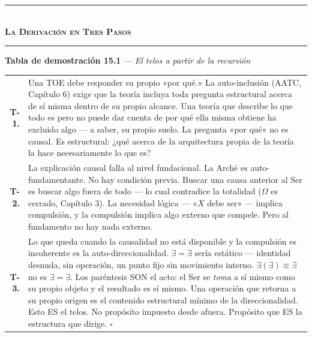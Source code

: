 \documentclass[10pt, openany, oneside]{book}
\renewcommand{\normalsize}{\fontsize{10}{13}\selectfont}
\renewcommand{\footnotesize}{\fontsize{8.5}{11}\selectfont}
\begin{document}

\begin{center}
    \rule{0.3\textwidth}{0.4pt}\\[0.5em]
    {\normalsize\bfseries\scshape La Derivación en Tres Pasos}\\[0.3em]
    \rule{0.3\textwidth}{0.4pt}
\end{center}

\vspace{1em}

\textbf{Tabla de demostración 15.1} --- \textit{El telos a partir de la recursión}

\vspace{0.5em}

{\footnotesize
\noindent\begin{tabular}{r p{}}
\textbf{T-1.} & Una TOE debe responder su propio «por qué.» La auto-inclusión (AATC, Capítulo 6) exige que la teoría incluya toda pregunta estructural acerca de sí misma dentro de su propio alcance. Una teoría que describe lo que todo es pero no puede dar cuenta de por qué ella misma obtiene ha excluido algo --- a saber, su propio suelo. La pregunta «por qué» no es causal. Es estructural: ¿qué acerca de la arquitectura propia de la teoría la hace necesariamente lo que es? \\[0.3em]
\textbf{T-2.} & La explicación causal falla al nivel fundacional. La Arch\={e} es auto-fundamentante. No hay condición previa. Buscar una causa anterior al Ser es buscar algo fuera de todo --- lo cual contradice la totalidad ($\Omega$ es cerrado, Capítulo 3). La necesidad lógica --- «$X$ debe ser» --- implica compulsión, y la compulsión implica algo externo que compele. Pero al fundamento no hay nada externo. \\[0.3em]
\textbf{T-3.} & Lo que queda cuando la causalidad no está disponible y la compulsión es incoherente es la auto-direccionalidad. $\exists = \exists$ sería estático --- identidad desnuda, sin operación, un punto fijo sin movimiento interno. $\exists(\exists) \equiv \exists$ no es $\exists = \exists$. Los paréntesis SON el acto: el Ser se \textit{toma} a sí mismo como su propio objeto y el resultado es sí mismo. Una operación que retorna a su propio origen es el contenido estructural mínimo de la direccionalidad. Esto ES el telos. No propósito impuesto desde afuera. Propósito que ES la estructura que dirige. $\square$ \\[0.3em]
\end{tabular}
}
\end{document}
